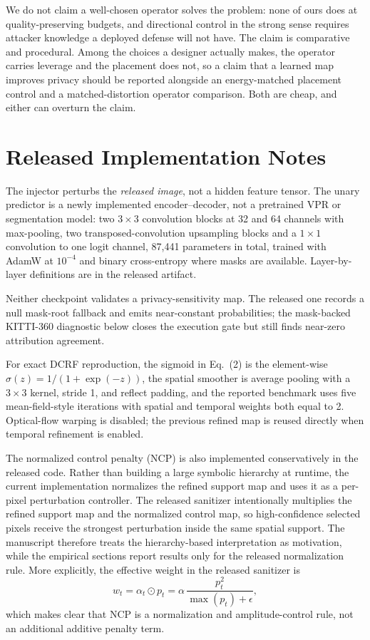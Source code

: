 \documentclass[10pt,journal]{IEEEtran}
\begin{document}
We do not claim a well-chosen operator solves the problem: none of ours does
at quality-preserving budgets, and directional control in the strong sense
requires attacker knowledge a deployed defense will not have. The claim is
comparative and procedural. Among the choices a designer actually makes, the
operator carries leverage and the placement does not, so a claim that a
learned map improves privacy should be reported alongside an energy-matched
placement control and a matched-distortion operator comparison. Both are
cheap, and either can overturn the claim.


\appendices
\section{Released Implementation Notes}
The injector perturbs the \emph{released image}, not a hidden feature tensor.
The unary predictor is a newly implemented encoder--decoder, not a pretrained
VPR or segmentation model: two $3\times3$ convolution blocks at 32 and 64
channels with max-pooling, two transposed-convolution upsampling blocks and a
$1\times1$ convolution to one logit channel, 87,441 parameters in total,
trained with AdamW at $10^{-4}$ and binary cross-entropy where masks are
available. Layer-by-layer definitions are in the released artifact.

Neither checkpoint validates a privacy-sensitivity map. The released one
records a null mask-root fallback and emits near-constant probabilities; the
mask-backed KITTI-360 diagnostic below closes the execution gate but still
finds near-zero attribution agreement.

For exact DCRF reproduction, the sigmoid in Eq.~(2) is the element-wise
$\sigma(z)=1/(1+\exp(-z))$, the spatial smoother is average pooling with a
$3\times3$ kernel, stride 1, and reflect padding, and the reported benchmark
uses five mean-field-style iterations with spatial and temporal weights both
equal to 2. Optical-flow warping is disabled; the previous refined map is
reused directly when temporal refinement is enabled.

The normalized control penalty (NCP) is also implemented conservatively in the released code. Rather than building a large symbolic hierarchy at runtime, the current implementation normalizes the refined support map and uses it as a per-pixel perturbation controller. The released sanitizer intentionally multiplies the refined support map and the normalized control map, so high-confidence selected pixels receive the strongest perturbation inside the same spatial support. The manuscript therefore treats the hierarchy-based interpretation as motivation, while the empirical sections report results only for the released normalization rule.
More explicitly, the effective weight in the released sanitizer is
\begin{equation}
\label{eq:appendix_effective_weight}
w_t=\alpha_t\odot p_t
    =\alpha\,\frac{p_t^2}{\max(p_t)+\epsilon},
\end{equation}
which makes clear that NCP is a normalization and amplitude-control rule,
not an additional additive penalty term.
\end{document}
